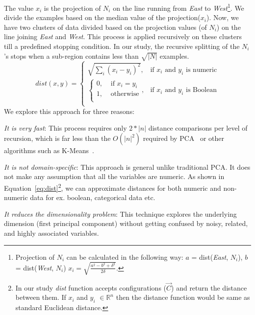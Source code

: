 \documentclass{newsig}
\begin{document}
The value $x_i$ is the projection of $N_i$
on the line  running  from {\em East} to {\em West}\footnote{Projection of $N_i$ can be calculated in the following way: $a$ = dist({\em East}, $N_i$), $b$ = dist({\em West}, $N_i$) $x_i = \sqrt{\frac{a^2 - b^2 + \delta^2}{2\delta}}$.}.  We divide
the examples based on the median value of the projection($x_i$). Now, we have two clusters of data divided based on the projection values (of $N_i$) on the line joining {\em East} and {\em West}. This process is applied recursively on these clusters till a predefined stopping condition. In our study, the  recursive splitting of the $N_i$'s stops when a sub-region
contains less than  $\sqrt{|N|}$ examples.
\begin{equation}
    dist(x, y) = 
    \begin{cases}
        \sqrt{\sum_i(x_i-y_i)^2},& \text{if $x_i$ and $y_i$ is numeric}\\
        \begin{cases}
            0, & \text{ if $x_i = y_i$}\\
            1, & \text{ otherwise}\\
        \end{cases}
        ,& \text{if $x_i$ and $y_i$ is Boolean}\\
    \end{cases}
    \label{eq:dist}
\end{equation}
We explore this approach for three reasons:
\begin{compactitem}
\item
{\em It is very fast}:
This process requires only $2*|n|$ distance comparisons
per level of recursion, which is far less than the $O(|n|^2)$
required by PCA~\cite{Du2008}
or other  algorithms such as K-Means~\cite{hamerly2010making}.
\item
{\em It is not domain-specific}:
This approach is general unlike traditional PCA. It does not make any assumption that all the variables are numeric. As shown in Equation~\ref{eq:dist}\footnote{In our study {\em dist} function accepts configurations ($\vec{C}$) and return the distance between them. If $x_i$ and $y_i$ $\in \mathbb{R}^n$ then the distance function would be same as standard Euclidean distance.}, we can approximate distances for both numeric and non-numeric data for ex. boolean, categorical data etc.

\item
{\em It reduces the dimensionality problem}:
This technique explores the underlying dimension (first principal component) without getting confused by noisy, related, and highly associated variables.
\end{compactitem}
\end{document}
